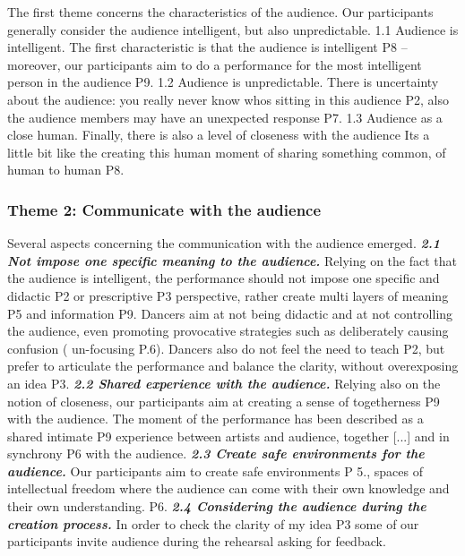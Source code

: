 The first theme concerns the characteristics of the audience. Our participants generally consider the audience intelligent, but also unpredictable. 1.1 Audience is intelligent. The first characteristic is that the audience is intelligent P8 – moreover, our participants aim to do a performance for the most intelligent person in the audience P9. 1.2 Audience is unpredictable. There is uncertainty about the audience: you really never know whos sitting in this audience P2, also the audience members may have an unexpected response P7. 1.3 Audience as a close human. Finally, there is also a level of closeness with the audience Its a little bit like the creating this human moment of sharing something common, of human to human P8.

\subsubsection{Theme 2: Communicate with the audience}
Several aspects concerning the communication with the audience emerged. 
\textbf{\textit{2.1 Not impose one specific meaning to the audience.}}
Relying on the fact that the audience is intelligent, the performance should not impose one speciﬁc and { didactic} P2 or { prescriptive} P3 perspective, rather create { multi layers of meaning} P5 and information P9.
Dancers aim at not being didactic and at not controlling the audience, even promoting provocative strategies such as deliberately causing confusion ({ un-focusing} P.6). Dancers also do not feel the need to { teach} P2, but prefer to { articulate the performance} and { balance the clarity}, without overexposing an idea P3. 
\textbf{\textit{2.2 Shared experience with the audience.}} 
Relying also on the notion of closeness, our participants aim at creating a sense of { togetherness} P9 with the audience.
The moment of the performance has been described as a shared { intimate} P9 experience between artists and audience, { together [...] and in synchrony} P6 with the audience.  
\textit{\textbf{2.3 Create safe environments for the audience.}} Our participants aim to create { safe environments} P 5., spaces of intellectual freedom where the audience { can come with their own knowledge and their own understanding.} P6. 
\textit{\textbf{2.4 Considering the audience during the creation process.}} In order to check { the clarity of my idea} P3 some of our participants invite audience during the rehearsal asking for feedback. %
 

